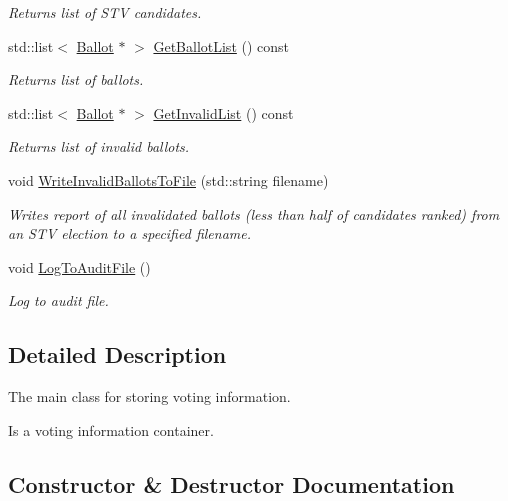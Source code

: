 \begin{DoxyCompactItemize}
\begin{DoxyCompactList}\small\item\em Returns list of S\+TV candidates. \end{DoxyCompactList}\item 
std\+::list$<$ \hyperlink{classBallot}{Ballot} $\ast$ $>$ \hyperlink{classVotingInfo_a73ac1888c3695a912ef6991b6667eeaf}{Get\+Ballot\+List} () const
\begin{DoxyCompactList}\small\item\em Returns list of ballots. \end{DoxyCompactList}\item 
std\+::list$<$ \hyperlink{classBallot}{Ballot} $\ast$ $>$ \hyperlink{classVotingInfo_a387f2f8293d6b90d2c877b237e2e43f6}{Get\+Invalid\+List} () const
\begin{DoxyCompactList}\small\item\em Returns list of invalid ballots. \end{DoxyCompactList}\item 
void \hyperlink{classVotingInfo_a2b8291b20085e9e4397f3d0dd0cc1a32}{Write\+Invalid\+Ballots\+To\+File} (std\+::string filename)
\begin{DoxyCompactList}\small\item\em Writes report of all invalidated ballots (less than half of candidates ranked) from an S\+TV election to a specified filename. \end{DoxyCompactList}\item 
void \hyperlink{classVotingInfo_a04dd909817f43719f40b3d537b74fe67}{Log\+To\+Audit\+File} ()
\begin{DoxyCompactList}\small\item\em Log to audit file. \end{DoxyCompactList}\end{DoxyCompactItemize}


\subsection{Detailed Description}
The main class for storing voting information. 

Is a voting information container. 

\subsection{Constructor \& Destructor Documentation}
\mbox{\label{classVotingInfo_a7bdb2f2026f5f68eee3fbee92855b759}} 
